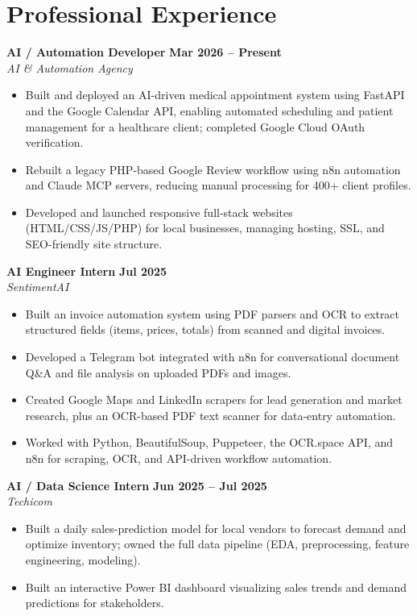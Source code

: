 \documentclass[a4paper,8pt]{extarticle}
\newcommand{\expitem}[4]{%
  \textbf{#1} \hfill \textbf{#3}\\
  \textit{#2} \hfill \textit{#4}\\
}
\begin{document}
\section{Professional Experience}

\expitem{AI / Automation Developer}{AI \& Automation Agency}{Mar 2026 -- Present}{}
\begin{itemize}
  \item Built and deployed an AI-driven medical appointment system using FastAPI and
        the Google Calendar API, enabling automated scheduling and patient management
        for a healthcare client; completed Google Cloud OAuth verification.
  \item Rebuilt a legacy PHP-based Google Review workflow using n8n automation and
        Claude MCP servers, reducing manual processing for 400+ client profiles.
  \item Developed and launched responsive full-stack websites (HTML/CSS/JS/PHP) for
        local businesses, managing hosting, SSL, and SEO-friendly site structure.
\end{itemize}

\expitem{AI Engineer Intern}{SentimentAI}{Jul 2025}{}
\begin{itemize}
  \item Built an invoice automation system using PDF parsers and OCR to extract
        structured fields (items, prices, totals) from scanned and digital invoices.
  \item Developed a Telegram bot integrated with n8n for conversational document
        Q\&A and file analysis on uploaded PDFs and images.
  \item Created Google Maps and LinkedIn scrapers for lead generation and market
        research, plus an OCR-based PDF text scanner for data-entry automation.
  \item Worked with Python, BeautifulSoup, Puppeteer, the OCR.space API, and n8n
        for scraping, OCR, and API-driven workflow automation.
\end{itemize}

\expitem{AI / Data Science Intern}{Techicom}{Jun 2025 -- Jul 2025}{}
\begin{itemize}
  \item Built a daily sales-prediction model for local vendors to forecast demand and
        optimize inventory; owned the full data pipeline (EDA, preprocessing, feature
        engineering, modeling).
  \item Built an interactive Power BI dashboard visualizing sales trends and demand
        predictions for stakeholders.
\end{itemize}
\end{document}
